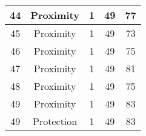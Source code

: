\documentclass[results.tex]{subfiles}
\begin{document}
\begin{center}
\begin{tabular}{| c || c | c | c | c |}
            \hline
            44                      & Proximity                    & 1                      & 49                      & 77                   \\
            \hline
            45                      & Proximity                    & 1                      & 49                      & 73                   \\
            \hline
            46                      & Proximity                    & 1                      & 49                      & 75                   \\
            \hline
            47                      & Proximity                    & 1                      & 49                      & 81                   \\
            \hline
            48                      & Proximity                    & 1                      & 49                      & 75                   \\
            \hline
            49                      & Proximity                    & 1                      & 49                      & 83                   \\
            \hline
            49                      & Protection                   & 1                      & 49                      & 83                   \\
            \hline
        \end{tabular}
    \end{center}
\end{document}
